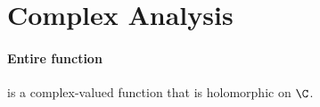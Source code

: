 \section{Complex Analysis}\label{41ab460}

\paragraph{Entire function} is a complex-valued function that is holomorphic
on $\C$.

